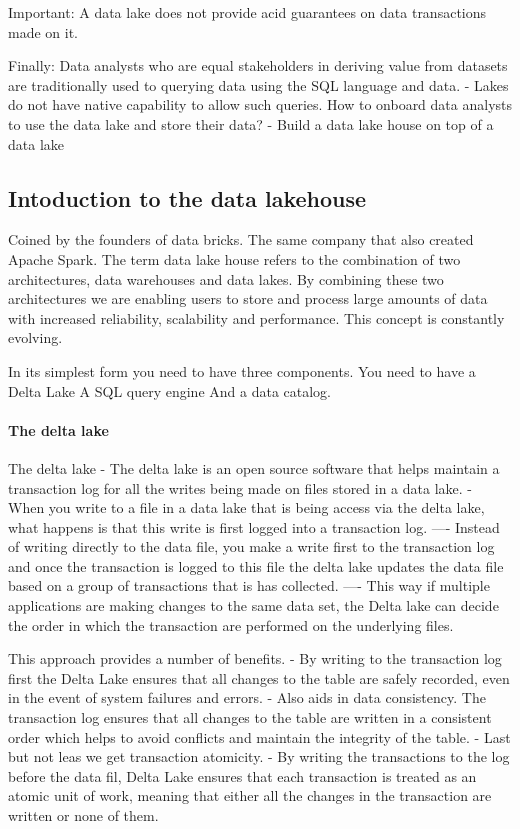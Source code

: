 \documentclass[a4paper, 11pt]{article}
\begin{document}
    Important: A data lake does not provide acid guarantees on data transactions made on it.

    Finally: Data analysts who are equal stakeholders in deriving value from datasets are traditionally used to querying data using the SQL language and data.
    - Lakes do not have native capability to allow such queries.
    How to onboard data analysts to use the data lake and store their data?
    - Build a data lake house on top of a data lake

    \subsection{Intoduction to the data lakehouse}

    Coined by the founders of data bricks. The same company that also created Apache Spark.
    The term data lake house refers to the combination of two architectures, data warehouses and data lakes.
    By combining these two architectures we are enabling users to store and process large amounts of data with increased reliability, scalability and performance.
    This concept is constantly evolving.

    In its simplest form you need to have three components.
    You need to have a Delta Lake
    A SQL query engine
    And a data catalog.

    \paragraph{The delta lake}
    The delta lake
    - The delta lake is an open source software that helps maintain a transaction log for all the writes being made on files stored in a data lake.
    - When you write to a file in a data lake that is being access via the delta lake, what happens is that this write is first logged into a transaction log.
    ---- Instead of writing directly to the data file, you make a write first to the transaction log and once the transaction is logged to this file the delta lake updates the data file based on a group of transactions that is has collected.
    ---- This way if multiple applications are making changes to the same data set, the Delta lake can decide the order in which the transaction are performed on the underlying files.

    This approach provides a number of benefits.
    - By writing to the transaction log first the Delta Lake ensures that all changes to the table are safely recorded, even in the event of system failures and errors.
    - Also aids in data consistency.
    The transaction log ensures that all changes to the table are written in a consistent order which helps to avoid conflicts and maintain the integrity of the table.
    - Last but not leas we get transaction atomicity.
    - By writing the transactions to the log before the data fil, Delta Lake ensures that each transaction is treated as an atomic unit of work, meaning that either all the changes in the transaction are written or none of them.
\end{document}
